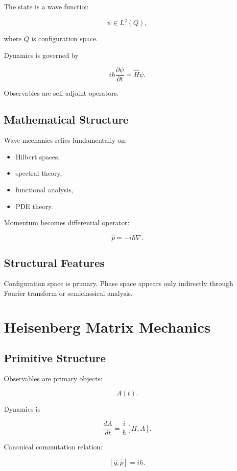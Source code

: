 \documentclass[11pt]{article}
\begin{document}
The state is a wave function

\[
\psi \in L^2(Q),
\]

where $Q$ is configuration space.

Dynamics is governed by

\[
i\hbar \frac{\partial \psi}{\partial t}
=
\hat H \psi.
\]

Observables are self-adjoint operators.

\subsection{Mathematical Structure}

Wave mechanics relies fundamentally on:

\begin{itemize}
\item Hilbert spaces,
\item spectral theory,
\item functional analysis,
\item PDE theory.
\end{itemize}

Momentum becomes differential operator:

\[
\hat p = -i\hbar \nabla.
\]

\subsection{Structural Features}

Configuration space is primary. Phase space appears only indirectly through Fourier transform or semiclassical analysis.

\section{Heisenberg Matrix Mechanics}

\subsection{Primitive Structure}

Observables are primary objects:

\[
A(t).
\]

Dynamics is

\[
\frac{dA}{dt}
=
\frac{i}{\hbar}[H,A].
\]

Canonical commutation relation:

\[
[\hat q,\hat p]=i\hbar.
\]
\end{document}
